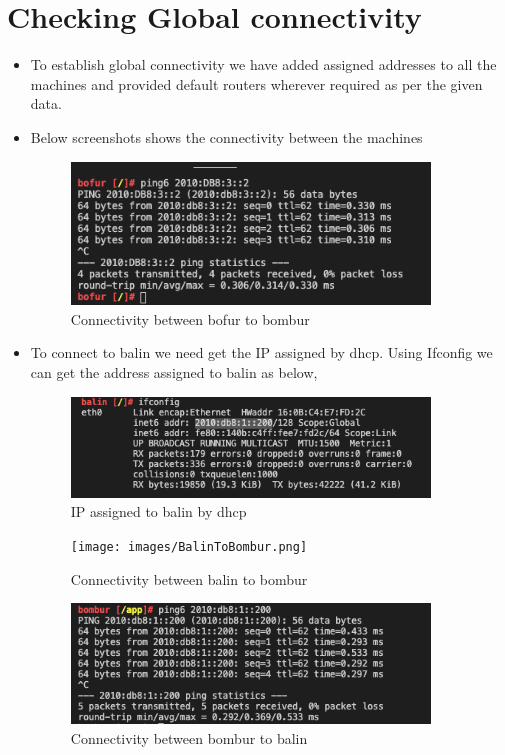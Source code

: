 \section{Checking Global connectivity}
\begin{itemize}
\item To establish global connectivity we have added assigned addresses to all the machines and provided default routers wherever required as per the given data.
\item Below screenshots shows the connectivity between the machines
\begin{figure}[H]
\centering
  \includegraphics[width=0.9\textwidth]{images/BofurToBombur.png}
  \caption{Connectivity between bofur to bombur}
  \label{fig:2.6}
\end{figure}
\item To connect to balin we need get the IP assigned by dhcp. Using Ifconfig we can get the address assigned to balin as below,
\begin{figure}[H]
\centering
  \includegraphics[width=0.9\textwidth]{images/BalinIPByDHCP.png}
  \caption{IP assigned to balin by dhcp}
  \label{fig:2.7}
\end{figure}

\begin{figure}[H]
\centering
  \texttt{[image: images/BalinToBombur.png]}
  \caption{Connectivity between balin to bombur}
  \label{fig:2.8}
\end{figure}
\begin{figure}[H]
\centering
  \includegraphics[width=0.9\textwidth]{images/BofurToBalin.png}
  \caption{Connectivity between bombur to balin}
  \label{fig:2.9}
\end{figure}
\end{itemize}

